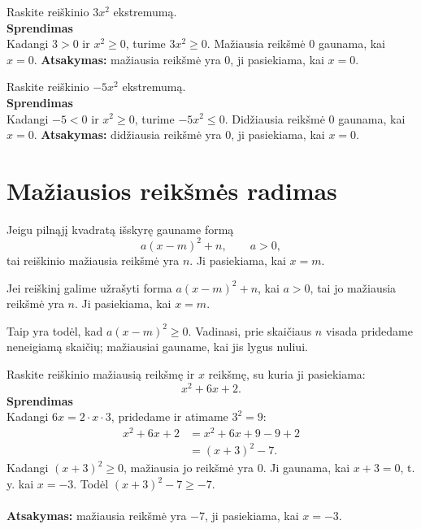 \documentclass[11pt,a4paper]{scrartcl}
\begin{document}
\begin{example}
Raskite reiškinio $3x^2$ ekstremumą.\\
\textbf{Sprendimas}\\
Kadangi $3>0$ ir $x^2\geq0$, turime $3x^2\geq0$. Mažiausia reikšmė $0$ gaunama, kai $x=0$.
\textbf{Atsakymas:} mažiausia reikšmė yra $0$, ji pasiekiama, kai $x=0$.
\end{example}

\begin{example}
Raskite reiškinio $-5x^2$ ekstremumą.\\
\textbf{Sprendimas}\\
Kadangi $-5<0$ ir $x^2\geq0$, turime $-5x^2\leq0$. Didžiausia reikšmė $0$ gaunama, kai $x=0$.
\textbf{Atsakymas:} didžiausia reikšmė yra $0$, ji pasiekiama, kai $x=0$.
\end{example}

\section{Mažiausios reikšmės radimas}

Jeigu pilnąjį kvadratą išskyrę gauname formą
\[
a(x-m)^2+n, \qquad a>0,
\]
tai reiškinio mažiausia reikšmė yra $n$. Ji pasiekiama, kai $x=m$.

\begin{property}
Jei reiškinį galime užrašyti forma $a(x-m)^2+n$, kai $a>0$, tai jo mažiausia reikšmė yra $n$. Ji pasiekiama, kai $x=m$.
\end{property}

Taip yra todėl, kad $a(x-m)^2\geq0$. Vadinasi, prie skaičiaus $n$ visada pridedame neneigiamą skaičių; mažiausiai gauname, kai jis lygus nuliui.

\begin{example}
Raskite reiškinio mažiausią reikšmę ir $x$ reikšmę, su kuria ji pasiekiama:
\[
x^2+6x+2.
\]
\textbf{Sprendimas}\\
Kadangi $6x=2\cdot x\cdot3$, pridedame ir atimame $3^2=9$:
\[
\begin{aligned}
x^2+6x+2
&=x^2+6x+9-9+2\\
&=(x+3)^2-7.
\end{aligned}
\]
Kadangi $(x+3)^2\geq0$, mažiausia jo reikšmė yra $0$. Ji gaunama, kai $x+3=0$, t. y. kai $x=-3$. Todėl $(x+3)^2-7\geq-7$.\\ \\
\textbf{Atsakymas:} mažiausia reikšmė yra $-7$, ji pasiekiama, kai $x=-3$.
\end{example}
\end{document}
